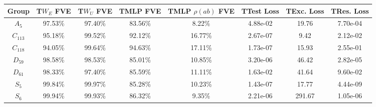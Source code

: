 \begin{tabular}{cccccccc}
\toprule
    Group & T$W_E$ FVE & T$W_U$ FVE & TMLP FVE & TMLP $\rho(ab)$ FVE & TTest Loss & TExc. Loss & TRes. Loss \\
\midrule
  $A_{5}$ &    97.53\% &    97.40\% &  83.56\% &              8.22\% &   4.88e-02 &      19.76 &   7.70e-04 \\
$C_{113}$ &    95.18\% &    99.52\% &  92.12\% &             16.77\% &   2.67e-07 &       9.42 &   2.12e-02 \\
$C_{118}$ &    94.05\% &    99.64\% &  94.63\% &             17.11\% &   1.73e-07 &      15.93 &   2.55e-01 \\
 $D_{59}$ &    98.58\% &    98.53\% &  85.01\% &             10.85\% &   3.20e-06 &      46.42 &   2.82e-05 \\
 $D_{61}$ &    98.33\% &    97.40\% &  85.59\% &             11.11\% &   1.63e-02 &      41.64 &   9.60e-02 \\
  $S_{5}$ &    99.84\% &    99.97\% &  85.28\% &             10.23\% &   1.43e-07 &      17.77 &   4.44e-09 \\
  $S_{6}$ &    99.94\% &    99.93\% &  86.32\% &              9.35\% &   2.21e-06 &     291.67 &   1.05e-06 \\
\bottomrule
\end{tabular}
